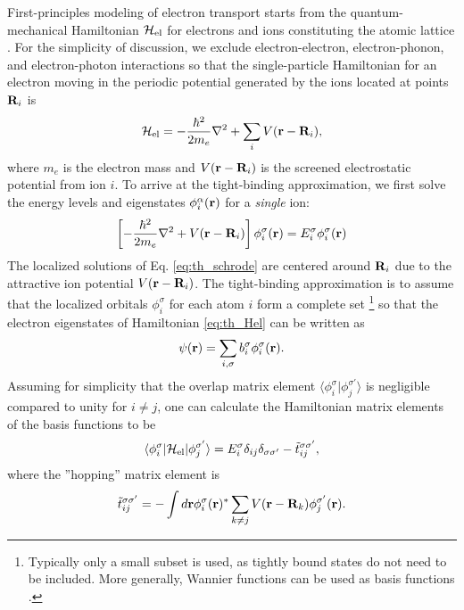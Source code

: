 First-principles modeling of electron transport starts from the quantum-mechanical Hamiltonian $\mathcal{H}_{\textrm{el}}$ for electrons and ions constituting the atomic lattice \cite{ashcroftmermin}. For the simplicity of discussion, we exclude electron-electron, electron-phonon, and electron-photon interactions so that the single-particle Hamiltonian for an electron moving in the periodic potential generated by the ions located at points $\mathbf{R}_i$ is \cite{ashcroftmermin}
\begin{equation}
 \mathcal{H}_{\textrm{el}} = - \frac{\hbar^2}{2m_e} \nabla^2  + \sum_i V(\mathbf{r}-\mathbf{R}_i), \label{eq:th_Hel}
\end{equation}
where $m_e$ is the electron mass and $V(\mathbf{r}-\mathbf{R}_i)$ is the screened electrostatic potential from ion $i$. To arrive at the tight-binding approximation, we first solve the energy levels and eigenstates $\phi_i^{\alpha}(\mathbf{r})$ for a \textit{single} ion:
\begin{equation}
 \left[ - \frac{\hbar^2}{2m_e} \nabla^2  +  V(\mathbf{r}-\mathbf{R}_i) \right] \phi_i^{\sigma} (\mathbf{r}) = E_i^{\sigma} \phi_i^{\sigma}(\mathbf{r}) \label{eq:th_schrode}
\end{equation}
The localized solutions of Eq. \eqref{eq:th_schrode} are centered around $\mathbf{R}_i$ due to the attractive ion potential $V(\mathbf{r}-\mathbf{R}_i)$. The tight-binding approximation is to assume that the localized orbitals $\phi_i^{\sigma}$ for each atom $i$ form a complete set \footnote{Typically only a small subset is used, as tightly bound states do not need to be included. More generally, Wannier functions can be used as basis functions \cite{ashcroftmermin}.} so that the electron eigenstates of Hamiltonian \eqref{eq:th_Hel} can be written as
\begin{equation}
 \psi(\mathbf{r}) = \sum_{i,\sigma} b_i^{\sigma} \phi_{i}^{\sigma}(\mathbf{r}).
\end{equation}
Assuming for simplicity that the overlap matrix element $\langle \phi_i^{\sigma}| \phi_j^{\sigma'} \rangle$ is negligible compared to unity for $i\neq j$, one can calculate the Hamiltonian matrix elements of the basis functions to be
\begin{equation}
 \langle \phi_i^{\sigma} | \mathcal{H}_{\textrm{el}} | \phi_j^{\sigma'} \rangle = E_i^{\sigma} \delta_{ij}\delta_{\sigma\sigma'}  - \tilde t_{ij}^{\sigma\sigma'}, \label{eq:th_Helements}
\end{equation}
where the ''hopping'' matrix element is 
\begin{equation}
  \tilde t_{ij}^{\sigma\sigma'} = - \int d\mathbf{r} \phi_i^{\sigma}(\mathbf{r})^*  \sum_{k\neq j} V(\mathbf{r}-\mathbf{R}_k)   \phi_j^{\sigma'}(\mathbf{r}).
\end{equation}
